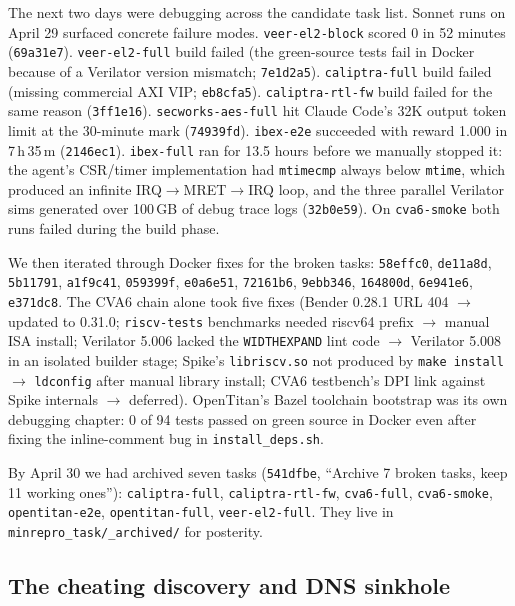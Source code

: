 \documentclass{article}
\begin{document}
The next two days were debugging across the candidate task list. Sonnet runs on April 29
surfaced concrete failure modes. \texttt{veer-el2-block} scored 0 in 52 minutes
(\texttt{69a31e7}). \texttt{veer-el2-full} build failed (the green-source tests fail in
Docker because of a Verilator version mismatch; \texttt{7e1d2a5}). \texttt{caliptra-full}
build failed (missing commercial AXI VIP; \texttt{eb8cfa5}).
\texttt{caliptra-rtl-fw} build failed for the same reason (\texttt{3ff1e16}).
\texttt{secworks-aes-full} hit Claude Code's 32K output token limit at the 30-minute mark
(\texttt{74939fd}). \texttt{ibex-e2e} succeeded with reward 1.000 in 7\,h\,35\,m
(\texttt{2146ec1}). \texttt{ibex-full} ran for 13.5 hours before we manually stopped it:
the agent's CSR/timer implementation had \texttt{mtimecmp} always below \texttt{mtime},
which produced an infinite IRQ$\to$MRET$\to$IRQ loop, and the three parallel Verilator
sims generated over 100\,GB of debug trace logs (\texttt{32b0e59}). On \texttt{cva6-smoke}
both runs failed during the build phase.

We then iterated through Docker fixes for the broken tasks: \texttt{58effc0}, \texttt{de11a8d},
\texttt{5b11791}, \texttt{a1f9c41}, \texttt{059399f}, \texttt{e0a6e51}, \texttt{72161b6},
\texttt{9ebb346}, \texttt{164800d}, \texttt{6e941e6}, \texttt{e371dc8}. The CVA6 chain
alone took five fixes (Bender 0.28.1 URL 404 $\to$ updated to 0.31.0; \texttt{riscv-tests}
benchmarks needed riscv64 prefix $\to$ manual ISA install; Verilator 5.006 lacked the
\texttt{WIDTHEXPAND} lint code $\to$ Verilator 5.008 in an isolated builder stage; Spike's
\texttt{libriscv.so} not produced by \texttt{make install} $\to$ \texttt{ldconfig} after
manual library install; CVA6 testbench's DPI link against Spike internals $\to$
deferred). OpenTitan's Bazel toolchain bootstrap was its own debugging chapter: 0 of 94
tests passed on green source in Docker even after fixing the inline-comment bug in
\texttt{install\_deps.sh}.

By April 30 we had archived seven tasks (\texttt{541dfbe}, ``Archive 7 broken tasks, keep
11 working ones''): \texttt{caliptra-full}, \texttt{caliptra-rtl-fw}, \texttt{cva6-full},
\texttt{cva6-smoke}, \texttt{opentitan-e2e}, \texttt{opentitan-full},
\texttt{veer-el2-full}. They live in \texttt{minrepro\_task/\_archived/} for posterity.

\subsection{The cheating discovery and DNS sinkhole}
\end{document}
